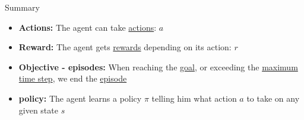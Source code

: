 \documentclass[aspectratio=169,xcolor=dvipsnames]{beamer}
\begin{document}

\begin{frame}{Summary}

\begin{minipage}{0.8\textwidth} 
    \vspace{-10pt}
    \begin{itemize}
        \item \textbf{Actions:} The agent can take \underline{actions}: $a$
        \vspace{10pt}
        
        \item \textbf{Reward:} The agent gets \underline{rewards} depending on its action: $r$
        \vspace{10pt}
        
        \item \textbf{Objective - episodes:} When reaching the \underline{goal}, or exceeding the \underline{maximum time step}, we end the \underline{episode}
        \vspace{10pt}

        \item \textbf{policy:} The agent learns a policy $\pi$ telling him what action $a$ to take on any given state $s$
        \vspace{10pt}


\end{itemize}
\end{minipage}
\end{frame}
\end{document}
